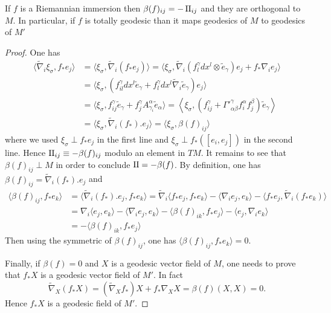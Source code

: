 \begin{lemma}
\label{lem:second-fund-form}
If \(f\) is a Riemannian immersion then \(\beta(f)_{ij} = -\sff_{ij}\) and they are orthogonal
to \(M\).
In particular, if \(f\) is totally geodesic than it maps geodesics of \(M\) to
geodesics of \(M'\)
\end{lemma}
\begin{proof}
One has
\begin{equation}
\label{eq:second-fund-form}
\begin{align*}
\langle \tilde\nabla_i\xi_\sigma, f_* e_j\rangle &= \langle\xi_\sigma, \tilde\nabla_i (f_* e_j)\rangle
				      		  = \langle \xi_\sigma,\tilde\nabla_i(f^\gamma_l dx^l\otimes \tilde e_\gamma) e_j + f_* \nabla_i e_j \rangle\\
						  &= \langle \xi_\sigma, (f^\gamma_{il} dx^l\tilde e_\gamma + f^\gamma_l dx^l \tilde\nabla_i\tilde e_\gamma) e_j \rangle\\
						  &= \langle \xi_\sigma, f^\gamma_{ij} \tilde e_\gamma + f^\gamma_j A^\alpha_{\gamma_i}\tilde e_\alpha \rangle
						   = \left\langle \xi_\sigma,  \left(f^\gamma_{ij} + \Gamma'^\gamma_{\alpha\beta} f^\alpha_i f^\beta_j \right)\tilde e_\gamma \right\rangle \\ 
						  &= \langle\xi_\sigma,\tilde\nabla_i(f_*).e_j \rangle = \langle \xi_\sigma,\beta(f)_{ij} \rangle
\end{align*}   
\end{equation}
where we used \(\xi_\sigma \perp f_* e_j\) in the first line and \(\xi_\sigma
\perp f_*([e_i, e_j])\) in the second line. Hence \(\sff_{ij} \equiv -\beta(f)_{ij}\)
modulo an element in \(TM\). It remains to see that
\(\beta(f)_{ij}\perp M\) in order to conclude \(\sff = -\beta(f)\). By definition, one has
\(\beta(f)_{ij} =
\tilde \nabla_i (f_*). e_j\) and
\begin{equation*}
\begin{align*}
\langle \beta(f)_{ij}, f_* e_k \rangle &= \langle\tilde \nabla_i (f_*). e_j, f_* e_k
\rangle = \tilde\nabla_i \langle f_* e_j, f_* e_k \rangle - \langle  \nabla_i e_j, e_k \rangle -
\langle  f_*e_j, \tilde\nabla_i(f_* e_k) \rangle  \\
&= \nabla_i \langle e_j,e_k \rangle - \langle
\nabla_i e_j, e_k \rangle -\langle \beta(f)_{ik}, f_* e_j \rangle - \langle e_j, \nabla_i e_k \rangle\\ &= -\langle \beta(f)_{ik}, f_* e_j \rangle
\end{align*}   
\end{equation*}
Then using the symmetric of \(\beta(f)_{ij}\), one has \(\langle \beta(f)_{ij}, f_* e_k
\rangle=0\).

Finally, if \(\beta(f)=0\) and \(X\) is a geodesic vector field of \(M\), one needs
to prove that \(f_*X\) is a geodesic vector field of \(M'\). In fact
\[
 \tilde\nabla_{X}(f_* X) = (\tilde\nabla_X f_*) X + f_*\nabla_X X = \beta(f)(X,X) = 0.
\]
Hence \(f_* X\) is a geodesic field of \(M'\). 
\end{proof}

